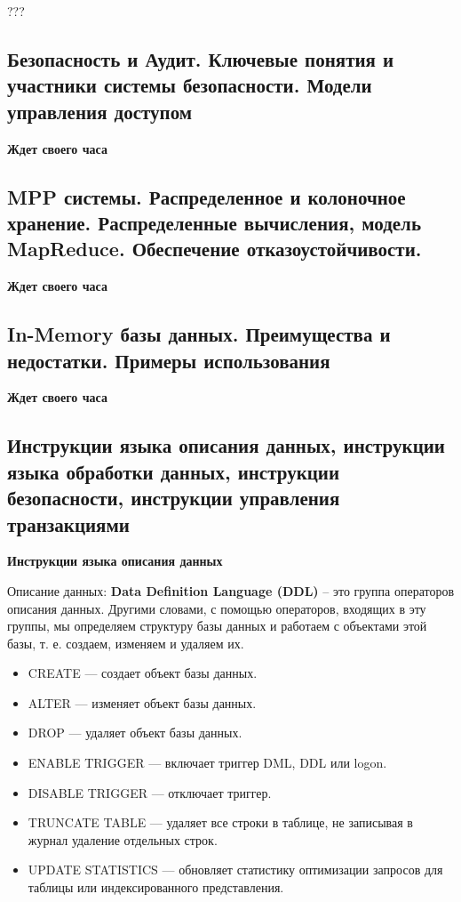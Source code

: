 ???


\subsection{Безопасность и Аудит. Ключевые понятия и участники системы безопасности. Модели управления доступом}

\textbf{Ждет своего часа}


\subsection{MPP системы. Распределенное и колоночное хранение. Распределенные вычисления, модель MapReduce. Обеспечение отказоустойчивости.}

\textbf{Ждет своего часа}

\subsection{In-Memory базы данных. Преимущества и недостатки. Примеры использования}

\textbf{Ждет своего часа}

\subsection{Инструкции языка описания данных, инструкции языка обработки данных, инструкции безопасности, инструкции управления транзакциями}

\textbf{Инструкции языка описания данных}

Описание данных: \textbf{Data Definition Language (DDL)}
– это группа операторов описания данных. Другими словами, с помощью операторов, входящих в эту группы, мы определяем структуру базы данных и работаем с объектами этой базы, т. е. создаем, изменяем и удаляем их.
\begin{itemize}
	\item CREATE — создает объект базы данных. 
	\item ALTER — изменяет объект базы данных.
	\item DROP — удаляет объект базы данных. 
	\item ENABLE TRIGGER — включает триггер DML, DDL или logon. 
	\item DISABLE TRIGGER — отключает триггер. 
	\item TRUNCATE TABLE — удаляет все строки в таблице, не записывая в журнал удаление отдельных строк. 
	\item UPDATE STATISTICS — обновляет статистику оптимизации запросов для таблицы или индексированного представления.
\end{itemize}

